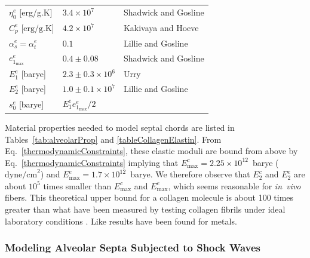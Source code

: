 \begin{table}
\begin{tabular}{lll}
        $\eta_0^e$ \hfill [erg/g.K] & $3.4 \times 10^7$ & 
        Shadwick and Gosline \cite{ShadwickGosline85} \\
        $C^e_p$ \hfill [$\textrm{erg/g.K}$] & $4.2 \times 10^7$  & 
        Kakivaya and Hoeve \cite{KakivayaHoeve75} \\
        $\alpha^e_s = \alpha^e_t$ & $0.1$ & 
        Lillie and Gosline \cite{LillieGosline02a} \\ 
        $e^e_{1_{\max}}$ & $0.4 \pm 0.08$ & Shadwick and Gosline \cite{ShadwickGosline85} \\
        $E^e_1$ \hfill [barye] & $2.3 \pm 0.3 \times 10^6$ & Urry \cite[Fig.~18]{Urry89} \\ 
        $E^e_2$ \hfill [barye] & $1.0 \pm 0.1 \times 10^7$ & 
        Lillie and Gosline \cite[Fig.~5]{LillieGosline07} \\
        $s^e_0$ \hfill [barye] & $E^e_1 e^e_{1_{\max}} / 2$ & \\
        \hline
    \end{tabular}
\end{table}

Material properties needed to model septal chords are listed in Tables~\ref{tab:alveolarProp} and \ref{tableCollagenElastin}.  From Eq.~\ref{thermodynamicConstraints}, these elastic moduli are bound from above by Eq.~\ref{thermodynamicConstraints} implying that $E^c_{\max} = 2.25 \times 10^{12}$~barye ($\text{dyne/cm}^2$) and $E^e_{\max} = 1.7 \times 10^{12}$~barye.  We therefore observe that $E^c_2$ and $E^e_2$ are about $10^5$ times smaller than $E^c_{\max}$ and $E^e_{\max}$, which seems reasonable for \textit{in~vivo\/} fibers.  This theoretical upper bound for a collagen molecule is about 100 times greater than what have been measured by testing collagen fibrils under ideal laboratory conditions \cite{Svenssonetal10}.  Like results have been found for metals.

\subsubsection{Modeling Alveolar Septa Subjected to Shock Waves}
\label{secConjugatePairs}

